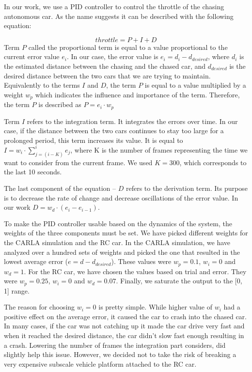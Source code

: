 \documentclass{ctuthesis/ctuthesis}
\begin{document}
In our work, we use a PID controller to control the throttle of the chasing autonomous car. As the name suggests it can be described with the following equation:

\begin{equation}
throttle = P+I+D    
\end{equation}
Term $P$ called the proportional term is equal to a value proportional to the current error value $e_i$. In our case, the error value is $e_i = d_i - d_{desired}$, where $d_i$ is the estimated distance between the chasing and the chased car, and $d_{desired}$ is the desired distance between the two cars that we are trying to maintain. Equivalently to the terms $I$ and $D$, the term $P$ is equal to a value multiplied by a weight $w_p$ which indicates the influence and importance of the term. Therefore, the term $P$ is described as $P = e_i\cdot w_p$ \par


Term $I$ refers to the integration term. It integrates the errors over time. In our case, if the distance between the two cars continues to stay too large for a prolonged period, this term increases its value. It is equal to $I = w_i\cdot \sum_{j=(i-K)}^{i} e_j$, where K is the number of frames representing the time we want to consider from the current frame. We used $K = 300$, which corresponds to the last 10 seconds.\par


The last component of the equation -- $D$ refers to the derivation term. Its purpose is to decrease the rate of change and decrease oscillations of the error value. In our work $D = w_d\cdot (e_i-e_{i-1})$. \par


To make the PID controller usable based on the dynamics of the system, the weights of the three components must be set. We have picked different weights for the CARLA simulation and the RC car. In the CARLA simulation, we have analyzed over a hundred sets of weights and picked the one that resulted in the lowest average error ($e = d - d_{desired}$). These values were $w_p=0.1$, $w_i=0$ and $w_d=1$. For the RC car, we have chosen the values based on trial and error. They were $w_p=0.25$, $w_i=0$ and $w_d=0.07$. Finally, we saturate the output to the [0, 1] range. \par


The reason for choosing $w_i=0$ is pretty simple. While higher value of $w_i$ had a positive effect on the average error, it caused the car to crash into the chased car. In many cases, if the car was not catching up it made the car drive very fast and when it reached the desired distance, the car didn't slow fast enough resulting in a crash. Lowering the number of frames the integration part considers, did slightly help this issue. However, we decided not to take the risk of breaking a very expensive subscale vehicle platform attached to the RC car.
\end{document}
